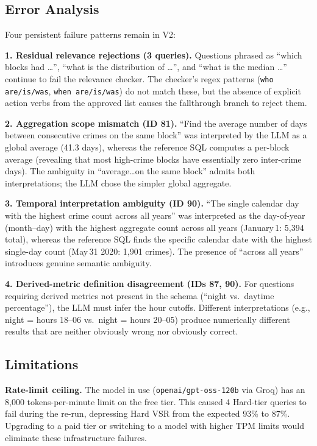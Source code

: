 \documentclass{article}
\begin{document}
\subsection{Error Analysis}

Four persistent failure patterns remain in V2:

\textbf{1. Residual relevance rejections (3 queries).}
Questions phrased as ``which blocks had \ldots'', ``what is the distribution of \ldots'', and ``what is the median \ldots'' continue to fail the relevance checker. The checker's regex patterns (\texttt{who are/is/was}, \texttt{when are/is/was}) do not match these, but the absence of explicit action verbs from the approved list causes the fallthrough branch to reject them.

\textbf{2. Aggregation scope mismatch (ID 81).}
``Find the average number of days between consecutive crimes on the same block'' was interpreted by the LLM as a global average (41.3 days), whereas the reference SQL computes a per-block average (revealing that most high-crime blocks have essentially zero inter-crime days). The ambiguity in ``average\ldots on the same block'' admits both interpretations; the LLM chose the simpler global aggregate.

\textbf{3. Temporal interpretation ambiguity (ID 90).}
``The single calendar day with the highest crime count across all years'' was interpreted as the day-of-year (month--day) with the highest aggregate count across all years (January\,1: 5,394 total), whereas the reference SQL finds the specific calendar date with the highest single-day count (May\,31 2020: 1,901 crimes). The presence of ``across all years'' introduces genuine semantic ambiguity.

\textbf{4. Derived-metric definition disagreement (IDs 87, 90).}
For questions requiring derived metrics not present in the schema (``night vs.\ daytime percentage''), the LLM must infer the hour cutoffs. Different interpretations (e.g., night = hours 18--06 vs.\ night = hours 20--05) produce numerically different results that are neither obviously wrong nor obviously correct.

\subsection{Limitations}

\textbf{Rate-limit ceiling.}
The model in use (\texttt{openai/gpt-oss-120b} via Groq) has an 8,000 tokens-per-minute limit on the free tier. This caused 4 Hard-tier queries to fail during the re-run, depressing Hard VSR from the expected 93\% to 87\%. Upgrading to a paid tier or switching to a model with higher TPM limits would eliminate these infrastructure failures.
\end{document}
